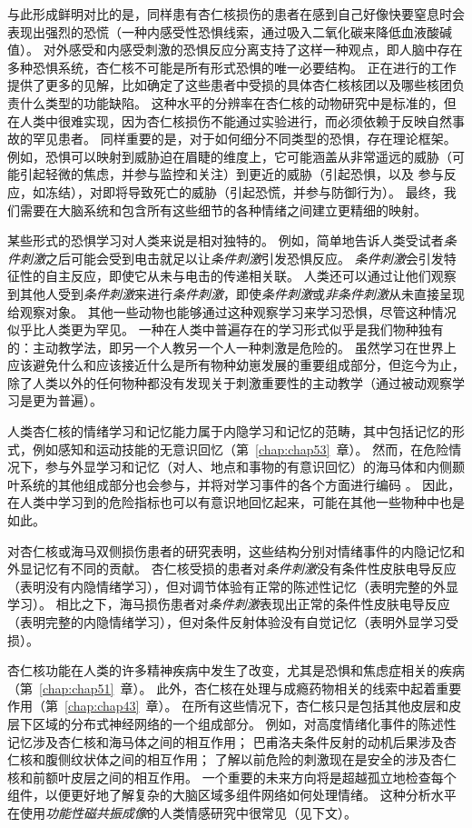 与此形成鲜明对比的是，同样患有杏仁核损伤的患者在感到自己好像快要窒息时会表现出强烈的恐慌（一种内感受性恐惧线索，通过吸入二氧化碳来降低血液酸碱值）。
对外感受和内感受刺激的恐惧反应分离支持了这样一种观点，即人脑中存在多种恐惧系统，杏仁核不可能是所有形式恐惧的唯一必要结构。
正在进行的工作提供了更多的见解，比如确定了这些患者中受损的具体杏仁核核团以及哪些核团负责什么类型的功能缺陷。
这种水平的分辨率在杏仁核的动物研究中是标准的，但在人类中很难实现，因为杏仁核损伤不能通过实验进行，而必须依赖于反映自然事故的罕见患者。
同样重要的是，对于如何细分不同类型的恐惧，存在理论框架。
例如，恐惧可以映射到威胁迫在眉睫的维度上，它可能涵盖从非常遥远的威胁（可能引起轻微的焦虑，并参与监控和关注）到更近的威胁（引起恐惧，以及 参与反应，如冻结），对即将导致死亡的威胁（引起恐慌，并参与防御行为）。
最终，我们需要在大脑系统和包含所有这些细节的各种情绪之间建立更精细的映射。


某些形式的恐惧学习对人类来说是相对独特的。
例如，简单地告诉人类受试者\textit{条件刺激}之后可能会受到电击就足以让\textit{条件刺激}引发恐惧反应。
\textit{条件刺激}会引发特征性的自主反应，即使它从未与电击的传递相关联。
人类还可以通过让他们观察到其他人受到\textit{条件刺激}来进行\textit{条件刺激}，即使\textit{条件刺激}或\textit{非条件刺激}从未直接呈现给观察对象。
其他一些动物也能够通过这种观察学习来学习恐惧，尽管这种情况似乎比人类更为罕见。
一种在人类中普遍存在的学习形式似乎是我们物种独有的：主动教学法，即另一个人教另一个人一种刺激是危险的。
虽然学习在世界上应该避免什么和应该接近什么是所有物种幼崽发展的重要组成部分，但迄今为止，除了人类以外的任何物种都没有发现关于刺激重要性的主动教学（通过被动观察学习是更为普遍）。


人类杏仁核的情绪学习和记忆能力属于内隐学习和记忆的范畴，其中包括记忆的形式，例如感知和运动技能的无意识回忆（第~\ref{chap:chap53}~章）。
然而，在危险情况下，参与外显学习和记忆（对人、地点和事物的有意识回忆）的海马体和内侧颞叶系统的其他组成部分也会参与，并将对学习事件的各个方面进行编码 。
因此，在人类中学习到的危险指标也可以有意识地回忆起来，可能在其他一些物种中也是如此。


对杏仁核或海马双侧损伤患者的研究表明，这些结构分别对情绪事件的内隐记忆和外显记忆有不同的贡献。
杏仁核受损的患者对\textit{条件刺激}没有条件性皮肤电导反应（表明没有内隐情绪学习），但对调节体验有正常的陈述性记忆（表明完整的外显学习）。
相比之下，海马损伤患者对\textit{条件刺激}表现出正常的条件性皮肤电导反应（表明完整的内隐情绪学习），但对条件反射体验没有自觉记忆（表明外显学习受损）。


杏仁核功能在人类的许多精神疾病中发生了改变，尤其是恐惧和焦虑症相关的疾病（第~\ref{chap:chap51}~章）。
此外，杏仁核在处理与成瘾药物相关的线索中起着重要作用（第~\ref{chap:chap43}~章）。
在所有这些情况下，杏仁核只是包括其他皮层和皮层下区域的分布式神经网络的一个组成部分。
例如，对高度情绪化事件的陈述性记忆涉及杏仁核和海马体之间的相互作用；
巴甫洛夫条件反射的动机后果涉及杏仁核和腹侧纹状体之间的相互作用；
了解以前危险的刺激现在是安全的涉及杏仁核和前额叶皮层之间的相互作用。
一个重要的未来方向将是超越孤立地检查每个组件，以便更好地了解复杂的大脑区域多组件网络如何处理情绪。
这种分析水平在使用\textit{功能性磁共振成像}的人类情感研究中很常见（见下文）。



